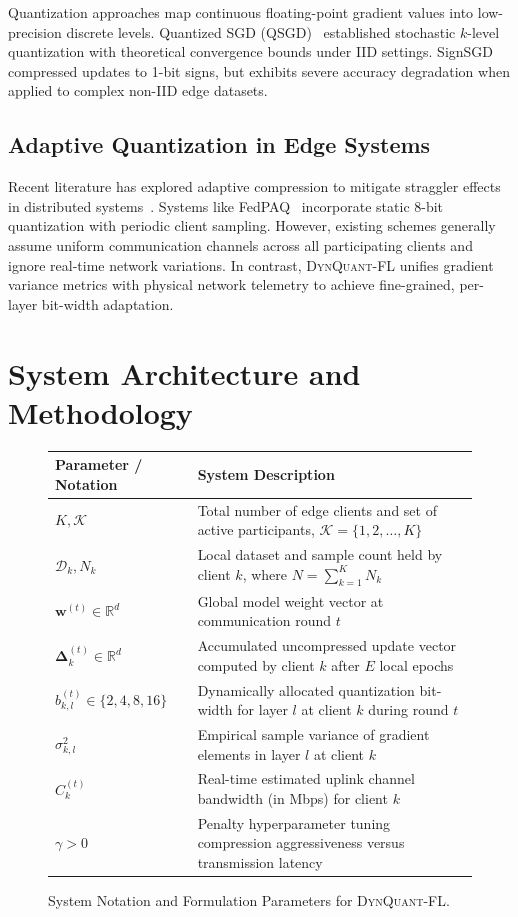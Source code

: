 \documentclass[conference]{IEEEtran}
\begin{document}
Quantization approaches map continuous floating-point gradient values into low-precision discrete levels. Quantized SGD (QSGD)~\cite{alistarh2017qsgd} established stochastic $k$-level quantization with theoretical convergence bounds under IID settings. SignSGD~\cite{bernstein2018signsgd} compressed updates to 1-bit signs, but exhibits severe accuracy degradation when applied to complex non-IID edge datasets.

\subsection{Adaptive Quantization in Edge Systems}
Recent literature has explored adaptive compression to mitigate straggler effects in distributed systems~\cite{wang2021cooperative, lim2020federated}. Systems like FedPAQ~\cite{kairouz2021advances} incorporate static 8-bit quantization with periodic client sampling. However, existing schemes generally assume uniform communication channels across all participating clients and ignore real-time network variations. In contrast, \textsc{DynQuant-FL} unifies gradient variance metrics with physical network telemetry to achieve fine-grained, per-layer bit-width adaptation.

\section{System Architecture and Methodology}

\begin{figure}[t]
\centering
\small
\setlength{\tabcolsep}{6pt}
\begin{tabular}{@{}ll@{}}
\toprule
\textbf{Parameter / Notation} & \textbf{System Description} \\
\midrule
$K, \mathcal{K}$ & Total number of edge clients and set of active participants, $\mathcal{K} = \{1, 2, \dots, K\}$ \\
$\mathcal{D}_k, N_k$ & Local dataset and sample count held by client $k$, where $N = \sum_{k=1}^K N_k$ \\
$\mathbf{w}^{(t)} \in \mathbb{R}^d$ & Global model weight vector at communication round $t$ \\
$\boldsymbol{\Delta}_k^{(t)} \in \mathbb{R}^d$ & Accumulated uncompressed update vector computed by client $k$ after $E$ local epochs \\
$b_{k, l}^{(t)} \in \{2, 4, 8, 16\}$ & Dynamically allocated quantization bit-width for layer $l$ at client $k$ during round $t$ \\
$\sigma_{k, l}^2$ & Empirical sample variance of gradient elements in layer $l$ at client $k$ \\
$C_k^{(t)}$ & Real-time estimated uplink channel bandwidth (in Mbps) for client $k$ \\
$\gamma > 0$ & Penalty hyperparameter tuning compression aggressiveness versus transmission latency \\
\bottomrule
\end{tabular}
\caption{System Notation and Formulation Parameters for \textsc{DynQuant-FL}.}
\label{tab:notation}
\end{figure}
\end{document}
